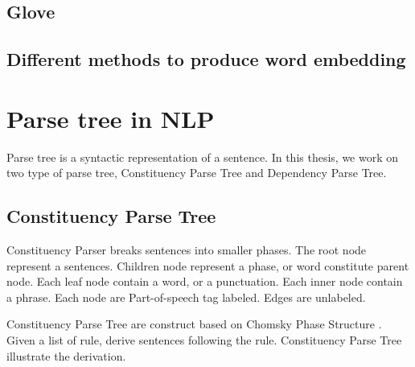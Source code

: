 \subsection{Glove}

\subsection{Different methods to produce word embedding}

\section{Parse tree in NLP}
Parse tree is a syntactic representation of a sentence. In this thesis, we work on two type of parse tree, Constituency Parse Tree and Dependency Parse Tree.
\subsection{Constituency Parse Tree}
Constituency Parser breaks sentences into smaller phases. The root node represent a sentences. Children node represent a phase, or word constitute parent node. Each leaf node contain a word, or a punctuation. Each inner node contain a phrase. Each node are Part-of-speech tag labeled. Edges are unlabeled.

Constituency Parse Tree are construct based on Chomsky Phase Structure \cite{chomsky2002syntactic}. Given a list of rule, derive sentences following the rule. Constituency Parse Tree illustrate the derivation.


